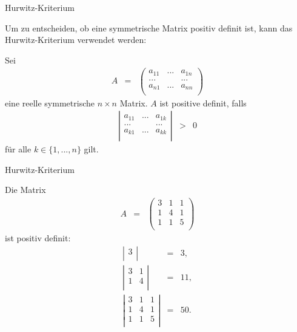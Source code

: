 \documentclass[german]{beamer}
\newcommand{\bq}{\begin{eqnarray*}}
\newcommand{\eq}{\end{eqnarray*}}
\begin{document}
\begin{frame}{Hurwitz-Kriterium}

Um zu entscheiden, ob eine symmetrische Matrix positiv definit ist, kann das Hurwitz-Kriterium
verwendet werden:

\begin{theorem}[Hurwitz]
Sei
\bq
 A & = & \left( \begin{array}{ccc}
 a_{11} & ... & a_{1n} \\
 ... & & ... \\
 a_{n1} & ... & a_{nn} \\
 \end{array} \right)
\eq
eine reelle symmetrische $n \times n$ Matrix.
$A$ ist positive definit, falls
\bq
 \left| \begin{array}{ccc}
 a_{11} & ... & a_{1k} \\
 ... & & ... \\
 a_{k1} & ... & a_{kk} \\
 \end{array} \right|
 & > & 0
\eq
f\"ur alle $k \in \{1,...,n\}$ gilt.
\end{theorem}

\end{frame}

\begin{frame}{Hurwitz-Kriterium}

\begin{example}
Die Matrix 
\bq
 A & = & \left( \begin{array}{ccc}
 3 & 1 & 1 \\
 1 & 4 & 1 \\
 1 & 1 & 5 \\
 \end{array} \right)
\eq
ist positiv definit:
\bq
 \left| \begin{array}{c}
 3 \\
 \end{array} \right|
 & = & 3,
 \nonumber \\
 \left| \begin{array}{cc}
 3 & 1 \\
 1 & 4 \\
 \end{array} \right|
 & = & 11,
 \nonumber \\
 \left| \begin{array}{ccc}
 3 & 1 & 1 \\
 1 & 4 & 1 \\
 1 & 1 & 5 \\
 \end{array} \right|
 & = & 50.
\eq
\end{example}

\end{frame}
\end{document}
